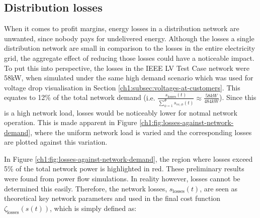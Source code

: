 \subsection{Distribution losses}
\label{ch1:subsec:losses}

When it comes to profit margins, energy losses in a distribution network are unwanted, since nobody pays for undelivered energy.
Although the losses a single distribution network are small in comparison to the losses in the entire electricity grid, the aggregate effect of reducing those losses could have a noticeable impact.
To put this into perspective, the losses in the IEEE LV Test Case network were 58kW, when simulated under the same high demand scenario which was used for voltage drop visualisation in Section \ref{ch1:subsec:voltages-at-customers}.
This equates to 12\% of the total network demand ($\text{i.e. }\frac{s_\text{losses}(t)}{\sum_{\phi=1}^\Phi{s_{ss,\phi}(t)}} \approx \frac{58kW}{484kW}$).
Since this is a high network load, losses would be noticeably lower for notmal network operation.
This is made apparent in Figure \ref{ch1:fig:losses-against-network-demand}, where the uniform network load is varied and the corresponding losses are plotted against this variation.




In Figure \ref{ch1:fig:losses-against-network-demand}, the region where losses exceed 5\% of the total network power is highlighted in red.
These preliminary results were found from power flow simulations.
In reality however, losses cannot be determined this easily.
Therefore, the network losses, $s_\text{losses}(t)$, are seen as theoretical key network parameters and used in the final cost function $\zeta_\text{losses}(s(t))$, which is simply defined as:




